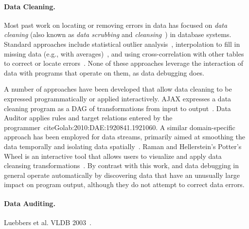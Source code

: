 
\paragraph{Data Cleaning.}
Most past work on locating or removing errors in data has focused
on \emph{data cleaning} (also known as \emph{data scrubbing}
and \emph{cleansing}~\cite{DBLP:journals/debu/RahmD00}) in database
systems. Standard approaches include statistical outlier
analysis~\cite{FIXME}, interpolation to fill in missing data (e.g.,
with averages)~\cite{FIXME}, and using cross-correlation with other
tables to correct or locate errors~\cite{FIXME}. None of these
approaches leverage the interaction of data with programs that operate
on them, as data debugging does.



A number of approaches have been developed that allow data cleaning to
be expressed programmatically or applied interactively. AJAX expresses
a data cleaning program as a DAG of transformations from input to
output~\cite{Galhardas:2000:AED:342009.336568}. Data Auditor applies
rules and target relations entered by the
programmer~cite{Golab:2010:DAE:1920841.1921060}. A similar
domain-specific approach has been employed for data streams, primarily
aimed at smoothing the data temporally and isolating data
spatially~\cite{1617508}. Raman and Hellerstein's Potter's Wheel is an
interactive tool that allows users to visualize and apply data
cleansing transformations~\cite{Raman:2001:PWI:645927.672045}. By
contrast with this work, \checkcell{} and data debugging in general
operate automatically by discovering data that have an unusually large
impact on program output, although they do not attempt to correct data
errors.

\paragraph{Data Auditing.}
Luebbers et al. VLDB 2003~\cite{Luebbers:2003:SDD:1315451.1315499}.

